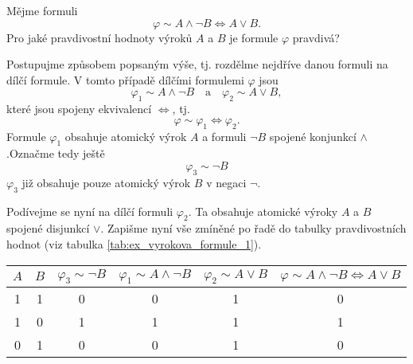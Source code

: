 \begin{example}\label{ex:vyrokova_formule_1}
    Mějme formuli
    \begin{equation*}
        \varphi\sim A \land \neg B \iff A \lor B.
    \end{equation*}
    Pro jaké pravdivostní hodnoty výroků $A$ a $B$ je formule $\varphi$ pravdivá?
    \begin{solution}
        Postupujme způsobem popsaným výše, tj. rozdělme nejdříve danou formuli na dílčí formule. V tomto případě dílčími formulemi $\varphi$ jsou
        \begin{equation*}
            \varphi_1\sim A \land \neg B \quad \text{a} \quad \varphi_2\sim A \lor B,
        \end{equation*}
        které jsou spojeny ekvivalencí $\iff$, tj.
        \begin{equation*}
            \varphi\sim \varphi_1 \iff \varphi_2.
        \end{equation*}
        Formule $\varphi_1$ obsahuje atomický výrok $A$ a formuli $\neg B$ spojené konjunkcí $\land$.\linebreak Označme tedy ještě
        \begin{equation*}
            \varphi_3\sim \neg B
        \end{equation*}
        $\varphi_3$ již obsahuje pouze atomický výrok $B$ v negaci $\neg$.\par
        Podívejme se nyní na dílčí formuli $\varphi_2$. Ta obsahuje atomické výroky $A$ a $B$ spojené disjunkcí $\lor$. Zapišme nyní vše zmíněné po řadě do tabulky pravdivostních hodnot (viz tabulka \ref{tab:ex_vyrokova_formule_1}).\par
        \begin{table}[H]
            \centering
            \begin{tabular}{|cc|cccc|}
            \hline
            $A$ & $B$ & $\varphi_3\sim \neg B$ & $\varphi_1\sim A \land \neg B$ & $\varphi_2\sim A \lor B$ & $\varphi\sim A \land \neg B \iff A \lor B$ \\ \hline
            1   & 1   & 0               & 0                          & 1                    & 0                                          \\
            1   & 0   & 1               & 1                          & 1                    & 1                                          \\
            0   & 1   & 0               & 0                          & 1                    & 0                                          \\

\end{tabular}
\end{table}
\end{solution}
\end{example}
